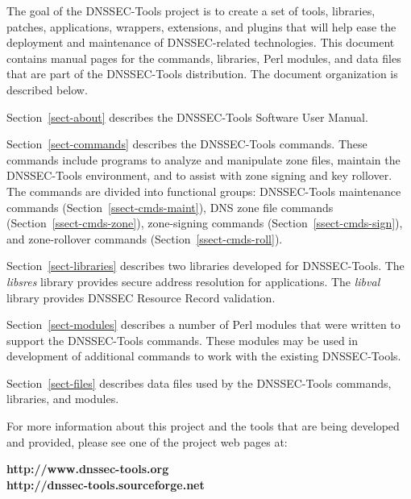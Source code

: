 \documentclass[12pt]{article}
\newcommand{\lib}[1]{{\em #1}}
\newcommand{\url}[1]{{\bf #1}}
\begin{document}
The goal of the DNSSEC-Tools project is to create a set of tools, libraries,
patches, applications, wrappers, extensions, and plugins that will help ease
the deployment and maintenance of DNSSEC-related technologies. This document contains manual
pages for the commands, libraries, Perl modules, and data files that are part
of the DNSSEC-Tools distribution.  The document organization is described
below.

\begin{description}

\item
Section~\ref{sect-about} describes the DNSSEC-Tools Software User Manual.

\item
Section~\ref{sect-commands} describes the DNSSEC-Tools commands.  These
commands include programs to analyze and manipulate zone files, maintain the
DNSSEC-Tools environment, and to assist with zone signing and key rollover.
The commands are divided into functional groups:
DNSSEC-Tools maintenance commands (Section~\ref{ssect-cmds-maint}),
DNS zone file commands (Section~\ref{ssect-cmds-zone}),
zone-signing commands (Section~\ref{ssect-cmds-sign}), and
zone-rollover commands (Section~\ref{ssect-cmds-roll}).

\item
Section~\ref{sect-libraries} describes two libraries developed for
DNSSEC-Tools.  The \lib{libsres} library provides secure address resolution
for applications.  The \lib{libval} library provides DNSSEC Resource Record
validation.

\item
Section~\ref{sect-modules} describes a number of Perl modules that were
written to support the DNSSEC-Tools commands.  These modules may be used in
development of additional commands to work with the existing DNSSEC-Tools.

\item
Section~\ref{sect-files} describes data files used by the DNSSEC-Tools
commands, libraries, and modules.

\end{description}

For more information about this project and the tools that are being developed
and provided, please see one of the project web pages at:

\url{http://www.dnssec-tools.org}  \\
\url{http://dnssec-tools.sourceforge.net}

\end{document}
